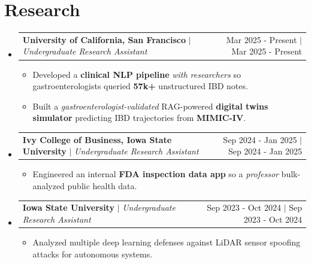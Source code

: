 \documentclass[11pt]{article}
\makeatletter
\newcommand{\resumeItem}[1]{
  \item\small{{#1\vspace{0pt}}}
}
\newcommand{\resumeSubheading}[4]{
  \item
    \begin{tabular*}{0.97\textwidth}[t]{l@{\extracolsep{\fill}}r}
      {\textbf{#1} $|$  #3} & \ifx\relax#4\relax #2\else #4 $|$ #2\fi \\
    \end{tabular*}\vspace{-6pt}
}
\newcommand{\resumeSubHeadingListStart}{\begin{itemize}[leftmargin=-0in, label={}]}
\newcommand{\resumeSubHeadingListEnd}{\end{itemize}}
\newcommand{\resumeItemListStart}{\begin{itemize}[itemsep=4pt, parsep=0pt, topsep=6pt]}
\newcommand{\resumeItemListEnd}{\end{itemize}\vspace{-5pt}}
\makeatother
\begin{document}
\section{Research}
\resumeSubHeadingListStart
  \resumeSubheading
    {University of California, San Francisco}{Mar 2025 - Present}
    {\emph{Undergraduate Research Assistant}}{}
    \resumeItemListStart
      \resumeItem{Developed a \textbf{clinical NLP pipeline} \emph{with researchers} so gastroenterologists queried \textbf{57k+} unstructured IBD notes.}
      \resumeItem{Built a \emph{gastroenterologist-validated} RAG-powered \textbf{digital twins simulator} predicting IBD trajectories from \textbf{MIMIC-IV}.}
    \resumeItemListEnd
\vspace{0pt}
  \resumeSubheading
    {Ivy College of Business, Iowa State University}{Sep 2024 - Jan 2025}
    {\emph{Undergraduate Research Assistant}}{}
    \resumeItemListStart
      \resumeItem{Engineered an internal \textbf{FDA inspection data app} so a \emph{professor} bulk-analyzed public health data.}
    \resumeItemListEnd
\vspace{0pt}
  \resumeSubheading
    {Iowa State University}{Sep 2023 - Oct 2024}
    {\emph{Undergraduate Research Assistant}}{}
    \resumeItemListStart
      \resumeItem{Analyzed multiple deep learning defenses against LiDAR sensor spoofing attacks for autonomous systems.}
    \resumeItemListEnd
\vspace{0pt}
\resumeSubHeadingListEnd
\end{document}
